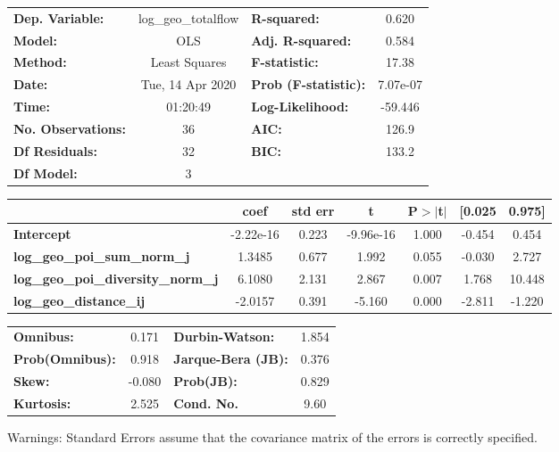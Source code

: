 \begin{center}
\begin{tabular}{lclc}
\toprule
\textbf{Dep. Variable:}                    & log\_geo\_totalflow & \textbf{  R-squared:         } &     0.620   \\
\textbf{Model:}                            &         OLS         & \textbf{  Adj. R-squared:    } &     0.584   \\
\textbf{Method:}                           &    Least Squares    & \textbf{  F-statistic:       } &     17.38   \\
\textbf{Date:}                             &   Tue, 14 Apr 2020  & \textbf{  Prob (F-statistic):} &  7.07e-07   \\
\textbf{Time:}                             &       01:20:49      & \textbf{  Log-Likelihood:    } &   -59.446   \\
\textbf{No. Observations:}                 &            36       & \textbf{  AIC:               } &     126.9   \\
\textbf{Df Residuals:}                     &            32       & \textbf{  BIC:               } &     133.2   \\
\textbf{Df Model:}                         &             3       & \textbf{                     } &             \\
\bottomrule
\end{tabular}
\begin{tabular}{lcccccc}
                                           & \textbf{coef} & \textbf{std err} & \textbf{t} & \textbf{P$> |$t$|$} & \textbf{[0.025} & \textbf{0.975]}  \\
\midrule
\textbf{Intercept}                         &    -2.22e-16  &        0.223     & -9.96e-16  &         1.000        &       -0.454    &        0.454     \\
\textbf{log\_geo\_poi\_sum\_norm\_j}       &       1.3485  &        0.677     &     1.992  &         0.055        &       -0.030    &        2.727     \\
\textbf{log\_geo\_poi\_diversity\_norm\_j} &       6.1080  &        2.131     &     2.867  &         0.007        &        1.768    &       10.448     \\
\textbf{log\_geo\_distance\_ij}            &      -2.0157  &        0.391     &    -5.160  &         0.000        &       -2.811    &       -1.220     \\
\bottomrule
\end{tabular}
\begin{tabular}{lclc}
\textbf{Omnibus:}       &  0.171 & \textbf{  Durbin-Watson:     } &    1.854  \\
\textbf{Prob(Omnibus):} &  0.918 & \textbf{  Jarque-Bera (JB):  } &    0.376  \\
\textbf{Skew:}          & -0.080 & \textbf{  Prob(JB):          } &    0.829  \\
\textbf{Kurtosis:}      &  2.525 & \textbf{  Cond. No.          } &     9.60  \\
\bottomrule
\end{tabular}
\end{center}

Warnings: \newline
 [1] Standard Errors assume that the covariance matrix of the errors is correctly specified.